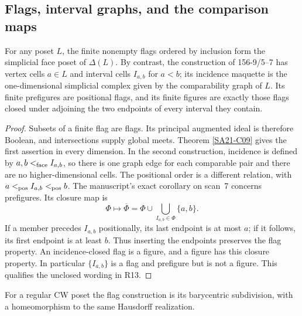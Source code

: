 \subsection{Flags, interval graphs, and the comparison maps}

\begin{theorem}\label{SA21-C11}
For any poset $L$, the finite nonempty flags ordered by inclusion form
the simplicial face poset of $\Delta(L)$. By contrast, the construction
of 156-9/5--7 has vertex cells $a\in L$ and interval cells $I_{a,b}$
for $a<b$; its incidence maquette is the one-dimensional simplicial
complex given by the comparability graph of $L$. Its finite prefigures
are positional flags, and its finite figures are exactly those flags
closed under adjoining the two endpoints of every interval they contain.
\end{theorem}
\begin{proof}
Subsets of a finite flag are flags. Its principal augmented ideal is
therefore Boolean, and intersections supply global meets. Theorem
\ref{SA21-C09} gives the first assertion in every dimension.
In the second construction, incidence is defined by
$a,b<_{\rm face}I_{a,b}$, so there is one graph edge for each comparable
pair and there are no higher-dimensional cells. The positional order
is a different relation, with
$a<_{\rm pos}I_{a,b}<_{\rm pos}b$.
The manuscript's exact corollary on scan~7 concerns prefigures. Its
closure map is
\[
 \Phi\longmapsto\overline\Phi
 =\Phi\cup\bigcup_{I_{a,b}\in\Phi}\{a,b\}.
\]
If a member precedes $I_{a,b}$ positionally, its last endpoint is at
most $a$; if it follows, its first endpoint is at least $b$. Thus
inserting the endpoints preserves the flag property. An incidence-closed
flag is a figure, and a figure has this closure property. In particular
$\{I_{a,b}\}$ is a flag and prefigure but is not a figure. This qualifies
the unclosed wording in R13.
\end{proof}

For a regular CW poset the flag construction is its barycentric
subdivision, with a homeomorphism to the same Hausdorff realization.

